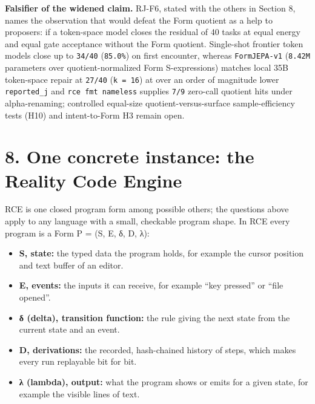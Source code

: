 \documentclass[10pt,letterpaper]{article}
\providecommand{\tightlist}{\setlength{\itemsep}{1pt}\setlength{\parskip}{0pt}}
\begin{document}
\textbf{Falsifier of the widened claim.} RJ-F6, stated with the others
in Section 8, names the observation that would defeat the Form quotient
as a help to proposers: if a token-space model closes the residual of 40
tasks at equal energy and equal gate acceptance without the Form
quotient. Single-shot frontier token models close up to \texttt{34/40}
(\texttt{85.0\%}) on first encounter, whereas \texttt{FormJEPA-\allowbreak{}v1}
(\texttt{8.42M} parameters over quotient-normalized Form S-expressions)
matches local 35B token-space repair at \texttt{27/40}
(\texttt{k\ =\ 16}) at over an order of magnitude lower
\texttt{reported\_\allowbreak{}j} and \texttt{rce\ fmt\ nameless} supplies
\texttt{7/9} zero-call quotient hits under alpha-renaming; controlled
equal-size quotient-versus-surface sample-efficiency tests (H10) and
intent-to-Form H3 remain open.

\section{8. One concrete instance: the Reality Code
Engine}\label{one-concrete-instance-the-reality-code-engine}

RCE is one closed program form among possible others; the questions
above apply to any language with a small, checkable program shape. In
RCE every program is a Form P = (S, E, δ, D, λ):

\begin{itemize}
\tightlist
\item
  \textbf{S, state:} the typed data the program holds, for example the
  cursor position and text buffer of an editor.
\item
  \textbf{E, events:} the inputs it can receive, for example ``key
  pressed'' or ``file opened''.
\item
  \textbf{δ (delta), transition function:} the rule giving the next
  state from the current state and an event.
\item
  \textbf{D, derivations:} the recorded, hash-chained history of steps,
  which makes every run replayable bit for bit.
\item
  \textbf{λ (lambda), output:} what the program shows or emits for a
  given state, for example the visible lines of text.
\end{itemize}
\end{document}
